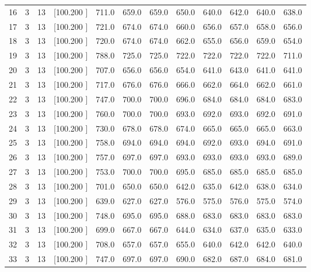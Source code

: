 \documentclass[12pt,a4paper]{article}
\begin{document}
\begin{center}
{\begin{tabular}{r r r r r r r r r r r r}
  16&  3& 13&[100.200   ]&   711.0&   659.0&   659.0&   650.0&   640.0&   642.0&   640.0&   638.0\\[-0.02in]
  17&  3& 13&[100.200   ]&   721.0&   674.0&   674.0&   660.0&   656.0&   657.0&   658.0&   656.0\\[-0.02in]
  18&  3& 13&[100.200   ]&   720.0&   674.0&   674.0&   662.0&   655.0&   656.0&   659.0&   654.0\\[-0.02in]
  19&  3& 13&[100.200   ]&   788.0&   725.0&   725.0&   722.0&   722.0&   722.0&   722.0&   711.0\\[-0.02in]
  20&  3& 13&[100.200   ]&   707.0&   656.0&   656.0&   654.0&   641.0&   643.0&   641.0&   641.0\\[-0.02in]
  21&  3& 13&[100.200   ]&   717.0&   676.0&   676.0&   666.0&   662.0&   664.0&   662.0&   661.0\\[-0.02in]
  22&  3& 13&[100.200   ]&   747.0&   700.0&   700.0&   696.0&   684.0&   684.0&   684.0&   683.0\\[-0.02in]
  23&  3& 13&[100.200   ]&   760.0&   700.0&   700.0&   693.0&   692.0&   693.0&   692.0&   691.0\\[-0.02in]
  24&  3& 13&[100.200   ]&   730.0&   678.0&   678.0&   674.0&   665.0&   665.0&   665.0&   663.0\\[-0.02in]
  25&  3& 13&[100.200   ]&   758.0&   694.0&   694.0&   694.0&   692.0&   693.0&   694.0&   691.0\\[-0.02in]
  26&  3& 13&[100.200   ]&   757.0&   697.0&   697.0&   693.0&   693.0&   693.0&   693.0&   689.0\\[-0.02in]
  27&  3& 13&[100.200   ]&   753.0&   700.0&   700.0&   695.0&   685.0&   685.0&   685.0&   685.0\\[-0.02in]
  28&  3& 13&[100.200   ]&   701.0&   650.0&   650.0&   642.0&   635.0&   642.0&   638.0&   634.0\\[-0.02in]
  29&  3& 13&[100.200   ]&   639.0&   627.0&   627.0&   576.0&   575.0&   576.0&   575.0&   574.0\\[-0.02in]
  30&  3& 13&[100.200   ]&   748.0&   695.0&   695.0&   688.0&   683.0&   683.0&   683.0&   683.0\\[-0.02in]
  31&  3& 13&[100.200   ]&   699.0&   667.0&   667.0&   644.0&   634.0&   637.0&   635.0&   633.0\\[-0.02in]
  32&  3& 13&[100.200   ]&   708.0&   657.0&   657.0&   655.0&   640.0&   642.0&   642.0&   640.0\\[-0.02in]
  33&  3& 13&[100.200   ]&   747.0&   697.0&   697.0&   690.0&   682.0&   687.0&   684.0&   681.0\\[-0.02in]

\end{tabular}}
\end{center}
\end{document}
